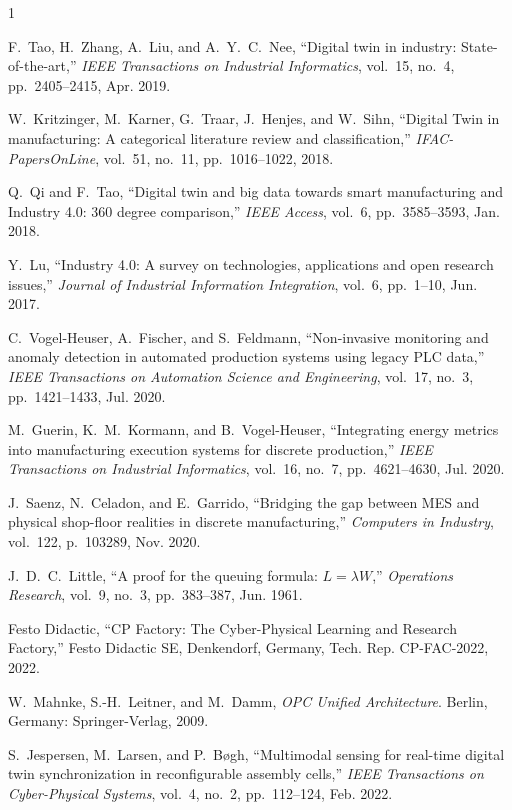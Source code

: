 \documentclass[journal]{IEEEtran}
\begin{document}
\begin{thebibliography}{1}

F.~Tao, H.~Zhang, A.~Liu, and A.~Y.~C.~Nee, ``Digital twin in industry: State-of-the-art,'' \textit{IEEE Transactions on Industrial Informatics}, vol.~15, no.~4, pp.~2405--2415, Apr. 2019.

W.~Kritzinger, M.~Karner, G.~Traar, J.~Henjes, and W.~Sihn, ``Digital Twin in manufacturing: A categorical literature review and classification,'' \textit{IFAC-PapersOnLine}, vol.~51, no.~11, pp.~1016--1022, 2018.

Q.~Qi and F.~Tao, ``Digital twin and big data towards smart manufacturing and Industry 4.0: 360 degree comparison,'' \textit{IEEE Access}, vol.~6, pp.~3585--3593, Jan. 2018.

Y.~Lu, ``Industry 4.0: A survey on technologies, applications and open research issues,'' \textit{Journal of Industrial Information Integration}, vol.~6, pp.~1--10, Jun. 2017.

C.~Vogel-Heuser, A.~Fischer, and S.~Feldmann, ``Non-invasive monitoring and anomaly detection in automated production systems using legacy PLC data,'' \textit{IEEE Transactions on Automation Science and Engineering}, vol.~17, no.~3, pp.~1421--1433, Jul. 2020.

M.~Guerin, K.~M.~Kormann, and B.~Vogel-Heuser, ``Integrating energy metrics into manufacturing execution systems for discrete production,'' \textit{IEEE Transactions on Industrial Informatics}, vol.~16, no.~7, pp.~4621--4630, Jul. 2020.

J.~Saenz, N.~Celadon, and E.~Garrido, ``Bridging the gap between MES and physical shop-floor realities in discrete manufacturing,'' \textit{Computers in Industry}, vol.~122, p.~103289, Nov. 2020.

J.~D.~C.~Little, ``A proof for the queuing formula: $L = \lambda W$,'' \textit{Operations Research}, vol.~9, no.~3, pp.~383--387, Jun. 1961.

Festo Didactic, ``CP Factory: The Cyber-Physical Learning and Research Factory,'' Festo Didactic SE, Denkendorf, Germany, Tech. Rep. CP-FAC-2022, 2022.

W.~Mahnke, S.-H.~Leitner, and M.~Damm, \textit{OPC Unified Architecture}. Berlin, Germany: Springer-Verlag, 2009.

S.~Jespersen, M.~Larsen, and P.~B{\o}gh, ``Multimodal sensing for real-time digital twin synchronization in reconfigurable assembly cells,'' \textit{IEEE Transactions on Cyber-Physical Systems}, vol.~4, no.~2, pp.~112--124, Feb. 2022.

\end{thebibliography}
\end{document}
